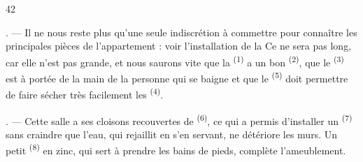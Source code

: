 \begin{VUpage}[44]{42}
\VUsaut{3.0mm}

. --- Il ne nous reste plus qu'une seule indiscrétion\nl
à commettre pour connaître les principales pièces de\nl
l'appartement : voir l'installation de la \nl
{} Ce ne sera pas long, car elle n'est pas grande,\nl
et nous saurons vite que la  \textsuperscript{(1)} a un\nl
bon  \textsuperscript{(2)}, que le  \textsuperscript{(3)} est\nl
à portée de la main de la personne qui se baigne\nl
et que le  \textsuperscript{(5)} doit permettre de faire\nl
sécher très facilement les  \textsuperscript{(4)}.

. --- Cette salle a ses cloisons recouvertes de\nl
{} \textsuperscript{(6)}, ce qui a permis d'installer un \nl
{} \textsuperscript{(7)} sans craindre que l'eau, qui rejaillit en\nl
s'en servant, ne détériore les murs. Un petit  \textsuperscript{(8)}\nl
en zinc, qui sert à prendre les bains de pieds, complète\nl
l'ameublement.

\VUsaut{6.0mm}
\VUfilet{22mm}
\end{VUpage}

